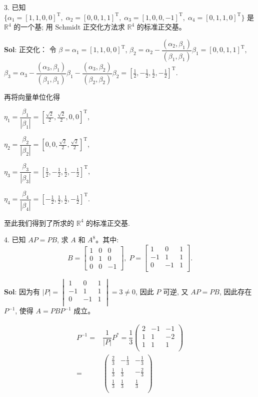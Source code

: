 3. 已知 $\Big\{\alpha_1=[1,1,0,0]^\text{T},\;\alpha_2=[0,0,1,1]^\text{T},\;\alpha_3=[1,0,0,-1]^\text{T},\;\alpha_4=[0,1,1,0]^\text{T}\Big\}$ 是 $\mathbb{R}^4$ 的一个基; 用 $\text{Schmidt}$ 正交化方法求 $\mathbb{R}^4$ 的标准正交基。

\textbf{Sol}:  正交化：  
令 $\beta=\alpha_1=[1,1,0,0]^\text{T}$, $\beta_2=\alpha_2-\dfrac{(\alpha_2,\beta_1)}{(\beta_1,\beta_1)}\beta_1=[0,0,1,1]^{\text{T}}$, $\beta_3=\alpha_3-\dfrac{(\alpha_3,\beta_1)}{(\beta_1,\beta_1)}\beta_1-\dfrac{(\alpha_3,\beta_2)}{(\beta_2,\beta_2)}\beta_2=[\frac{1}{2},-\frac{1}{2},\frac{1}{2},-\frac{1}{2}]^\text{T}$.\par


再将向量单位化得 \par
$\eta_1=\dfrac{\beta_1}{|\beta_1|}=[\frac{\sqrt{2}}{2},\frac{\sqrt{2}}{2},0,0]^\text{T}$,\par
$\eta_2=\dfrac{\beta_2}{|\beta_2|}=[0,0,\frac{\sqrt{2}}{2},\frac{\sqrt{2}}{2}]^\text{T}$,\par
$\eta_3=\dfrac{\beta_3}{|\beta_3|}=[\frac{1}{2},-\frac{1}{2},\frac{1}{2},-\frac{1}{2}]^\text{T}$,\par
$\eta_4=\dfrac{\beta_4}{|\beta_4|}=[-\frac{1}{2},\frac{1}{2},\frac{1}{2},-\frac{1}{2}]^\text{T}$.\par

至此我们得到了所求的 $\mathbb{R}^4$ 的标准正交基.

\vspace{12pt}

4. 已知 $AP=PB$, 求 $A$ 和 $A^8$。其中:
$$
B=\begin{bmatrix}
1&0&0\\
0&1&0\\
0&0&-1
\end{bmatrix},\;
P=\begin{bmatrix}
    1&0&1\\
    -1&1&1\\
    0&-1&1\\
\end{bmatrix}.
$$

\textbf{Sol}: 因为有 $|P|=\begin{vmatrix}
    1&0&1\\
    -1&1&1\\
    0&-1&1\\
\end{vmatrix}=3\not=0$, 因此 $P$ 可逆, 又 $AP=PB$, 因此存在 $P^{-1}$, 使得 $A=PBP^{-1}$ 成立。

$$
\begin{aligned}
P^{-1}=&\dfrac{1}{|P|}P^{*}=\dfrac{1}{3}
\begin{pmatrix}
2&-1&-1\\
1&1&-2\\
1&1&1\\
\end{pmatrix}\\
=&\begin{pmatrix}
\frac{2}{3}&-\frac{1}{3}&-\frac{1}{3}\\
\frac{1}{3}&\frac{1}{3}&-\frac{2}{3}\\
\frac{1}{3}&\frac{1}{3}&\frac{1}{3}\\
\end{pmatrix}
\end{aligned}
$$

